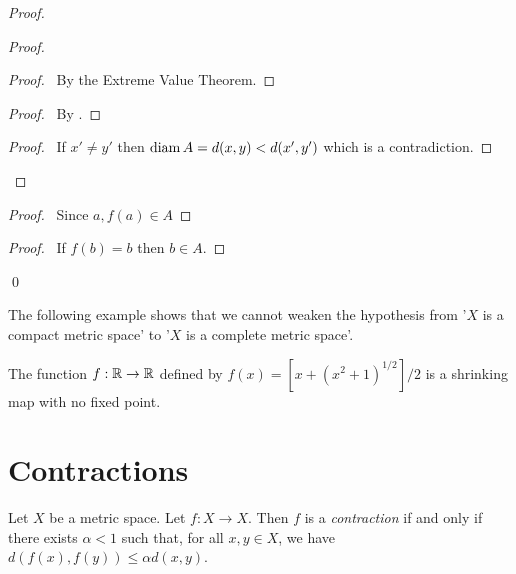 \begin{proof}
    \begin{proof}
        \begin{proof}
            \pf\ By the Extreme Value Theorem.
        \end{proof}
        \begin{proof}
            \pf\ By .
        \end{proof}
        \begin{proof}
            \pf\ If $x' \neq y'$ then $\operatorname{diam} A = d(x,y) < d(x',y')$ which is
            a contradiction.
        \end{proof}
    \end{proof}
    \begin{proof}
        \pf\ Since $a, f(a) \in A$
    \end{proof}
    \begin{proof}
        \pf\ If $f(b) = b$ then $b \in A$.
    \end{proof}
    \qed
\end{proof}

The following example shows that we cannot weaken the hypothesis from '$X$ is
a compact metric space' to '$X$ is a complete metric space'.

\begin{example}
    The function $f : \mathbb{R} \rightarrow \mathbb{R}$ defined by
    $f(x) = [x + (x^2 + 1)^{1/2}] / 2$ is a shrinking map with no fixed point.
\end{example}

\section{Contractions}

\begin{definition}[Contraction]
    Let $X$ be a metric space. Let $f : X \rightarrow X$. Then $f$ is a
    \emph{contraction} if and only if there exists $\alpha < 1$ such that,
    for all $x, y \in X$, we have $d(f(x),f(y)) \leq \alpha d(x,y)$.
\end{definition}

